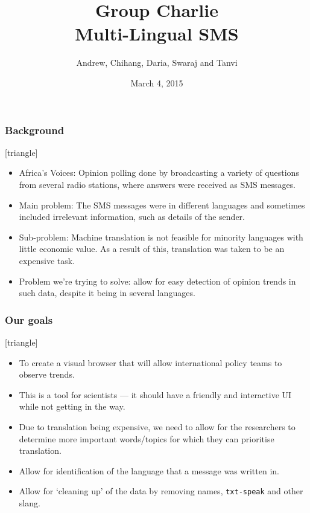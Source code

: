 \documentclass{beamer}
\title[Group Charlie --- Multi-Lingual SMS]{Group Charlie\\Multi-Lingual SMS}
\author[aw625, chw43, did23, sd660, tsp31]{Andrew, Chihang, Daria, Swaraj and Tanvi}
\institute[]{University of Cambridge}
\date{March 4, 2015}
\begin{document}
\maketitle

\begin{frame}
\frametitle{Background}
[triangle]
\begin{itemize}[<+->]
\item Africa's Voices: Opinion polling done by broadcasting a variety of questions from several radio stations, where answers were received as SMS messages.
\item Main problem: The SMS messages were in different languages and sometimes included irrelevant information, such as details of the sender.
\item Sub-problem: Machine translation is not feasible for minority languages with little economic value. As a result of this, translation was taken to be an expensive task.
\item Problem we're trying to solve: allow for easy detection of opinion trends in such data, despite it being in several languages.
\end{itemize}
\end{frame}

\begin{frame}
\frametitle{Our goals}
[triangle]
\begin{itemize}[<+->]
\item To create a visual browser that will allow international policy teams to observe trends.
\item This is a tool for scientists --- it should have a friendly and interactive UI while not getting in the way.
\item Due to translation being expensive, we need to allow for the researchers to determine more important words/topics for which they can prioritise translation.
\end{itemize}


\begin{itemize}[<+->]
\item Allow for identification of the language that a message was written in.
\item Allow for `cleaning up' of the data by removing names, {\tt txt-speak} and other slang.
\end{itemize}
\end{frame}
\end{document}
